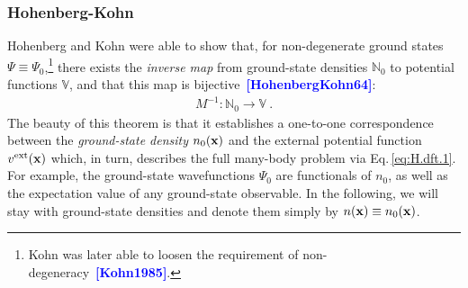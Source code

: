 \documentclass[a4paper,12pt]{book}
\newcommand{\CITE}[1]{\textcolor{blue}{{\bf [#1]}}}
\begin{document}
\subsubsection{Hohenberg-Kohn}
Hohenberg and Kohn were able to show that, for non-degenerate ground states $\Psi \equiv \Psi_0$,\footnote{Kohn was later able to loosen the requirement of non-degeneracy~\CITE{Kohn1985}.} there exists the \emph{inverse map} from ground-state densities $\mathds N_0$ to potential functions $\mathds V$, and that this map is bijective~\CITE{HohenbergKohn64}:
\begin{align}
	M^{-1}: \mathds N_0 \rightarrow \mathds V~. 
\end{align}
The beauty of this theorem is that it establishes a one-to-one correspondence between the \emph{ground-state density} $n_0 ({\bf x})$ and the external potential function $v^{\rm ext} ({\bf x})$ which, in turn, describes the full many-body problem via Eq.\,\eqref{eq:H.dft.1}. For example, the ground-state wavefunctions $\Psi_0$ are functionals of $n_0$, as well as the expectation value of any ground-state observable. In the following, we will stay with ground-state densities and denote them simply by $n ({\bf x}) \equiv n_0 ({\bf x})$.
\end{document}
